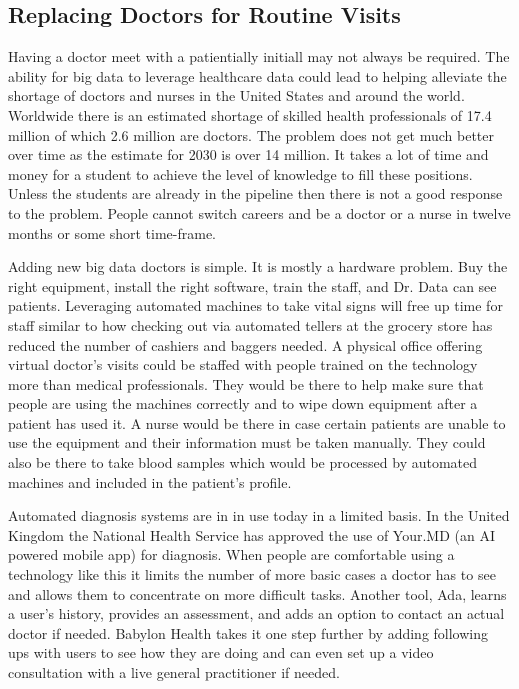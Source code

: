 \documentclass[sigconf]{acmart}
\begin{document}
\subsection{Replacing Doctors for Routine Visits}
Having a doctor meet with a patientially initiall may not always be 
required.  The ability for big data to leverage healthcare data could 
lead to helping alleviate the shortage of doctors and nurses in the 
United States and around the world.  Worldwide there is an estimated 
shortage of skilled health professionals of 17.4 million of which 2.6 
million are doctors.  The problem does not get much better over time as 
the estimate for 2030 is over 14 million\cite{WHOGHO}.  It takes a lot 
of time and money for a student to achieve the level of knowledge to 
fill these positions.  Unless the students are already in the pipeline 
then there is not a good response to the problem.  People cannot switch 
careers and be a doctor or a nurse in twelve months or some short time-frame.  

Adding new big data doctors is simple.  It is mostly a hardware problem.  
Buy the right equipment, install the right software, train the staff, and 
Dr. Data can see patients.  Leveraging automated machines to take vital 
signs will free up time for staff\cite{NextWeb} similar to how checking out 
via automated tellers at the grocery store has reduced the number of 
cashiers and baggers needed.  A physical office offering virtual doctor's 
visits could be staffed with people trained on the technology more than 
medical professionals.  They would be there to help make sure that people 
are using the machines correctly and to wipe down equipment after a patient 
has used it.  A nurse would be there in case certain patients are unable to 
use the equipment and their information must be taken manually.  They 
could also be there to take blood samples which would be processed by 
automated machines and included in the patient's profile.  

Automated diagnosis systems are in in use today in a limited basis.  In the 
United Kingdom the National Health Service has approved the use of Your.MD 
(an AI powered mobile app) for diagnosis.  When people are comfortable 
using a technology like this it limits the number of more basic cases a 
doctor has to see and allows them to concentrate on more difficult tasks.  
Another tool, Ada, learns a user's history, provides an assessment, and adds 
an option to contact an actual doctor if needed.  Babylon Health takes it 
one step further by adding following ups with users to see how they are 
doing and can even set up a video consultation with a live general 
practitioner if needed\cite{NextWeb}. 
\end{document}
